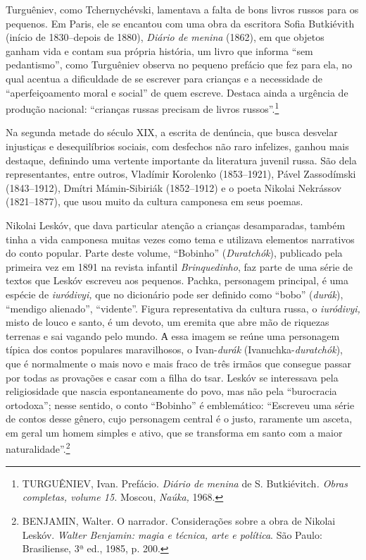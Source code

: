 Turguêniev, como Tchernychévski, lamentava a falta de bons livros russos
para os pequenos. Em Paris, ele se encantou com uma obra da escritora
Sofia Butkiévith (início de 1830--depois de 1880), \emph{Diário de
menina} (1862), em que objetos ganham vida e contam sua própria
história, um livro que informa ``sem pedantismo'', como Turguêniev
observa no pequeno prefácio que fez para ela, no qual acentua a
dificuldade de se escrever para crianças e a necessidade de
``aperfeiçoamento moral e social'' de quem escreve. Destaca ainda a
urgência de produção nacional: ``crianças russas precisam de livros
russos''.\footnote{TURGUÊNIEV, Ivan. Prefácio. \emph{Diário de menina}
  de S. Butkiévitch\emph{. Obras completas, volume 15.} Moscou,
  \emph{Naúka,} 1968.}

Na segunda metade do século XIX, a escrita de denúncia, que busca
desvelar injustiças e desequilíbrios sociais, com desfechos não raro
infelizes, ganhou mais destaque, definindo uma vertente importante da
literatura juvenil russa. São dela representantes, entre outros,
Vladímir Korolenko (1853--1921), Pável Zassodímski (1843--1912), Dmítri
Mámin-Sibiriák (1852--1912) e o poeta Nikolai Nekrássov (1821--1877),
que usou muito da cultura camponesa em seus poemas.

Nikolai Leskóv, que dava particular atenção a crianças desamparadas,
também tinha a vida camponesa muitas vezes como tema e utilizava
elementos narrativos do conto popular. Parte deste volume, ``Bobinho''
(\emph{Duratchók}), publicado pela primeira vez em 1891 na revista
infantil \emph{Brinquedinho}, faz parte de uma série de textos que
Leskóv escreveu aos pequenos. Pachka, personagem principal, é uma
espécie de \emph{iuródivyi,} que no dicionário pode ser definido como
``bobo'' (\emph{durák}), ``mendigo alienado'', ``vidente''. Figura
representativa da cultura russa, o \emph{iuródivyi,} misto de louco e
santo, é um devoto, um eremita que abre mão de riquezas terrenas e sai
vagando pelo mundo. А essa imagem se reúne uma personagem típica dos
contos populares maravilhosos, o Ivan-\emph{durák}
(Ivanuchka-\emph{duratchók}), que é normalmente o mais novo e mais fraco
de três irmãos que consegue passar por todas as provações e casar com a
filha do tsar. Leskóv se interessava pela religiosidade que nascia
espontaneamente do povo, mas não pela ``burocracia ortodoxa''; nesse
sentido, o conto ``Bobinho'' é emblemático: ``Escreveu uma série de
contos desse gênero, cujo personagem central é o justo, raramente um
asceta, em geral um homem simples e ativo, que se transforma em santo
com a maior naturalidade''.\footnote{BENJAMIN, Walter. O narrador.
  Considerações sobre a obra de Nikolai Leskóv. \emph{Walter Benjamin:
  magia e técnica, arte e política}. São Paulo: Brasiliense, 3ª ed.,
  1985, p. 200.}

